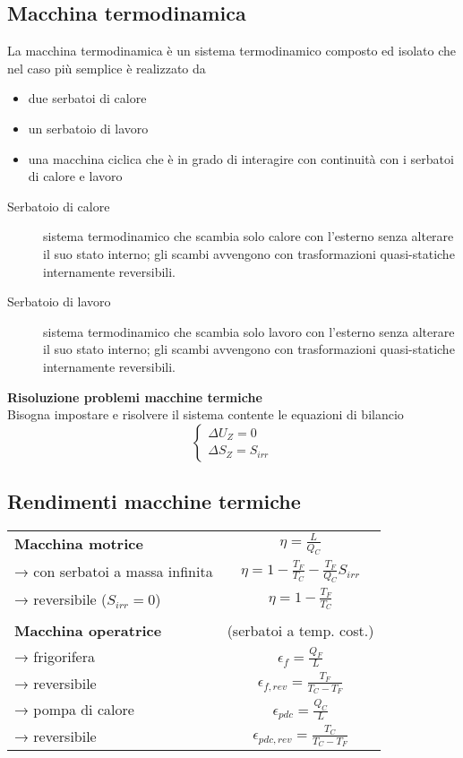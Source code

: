 \subsection{Macchina termodinamica}
La macchina termodinamica è un sistema termodinamico composto ed isolato che nel caso più semplice è realizzato da
\begin{itemize}
\item due serbatoi di calore
\item un serbatoio di lavoro
\item una macchina ciclica che è in grado di interagire con continuità con i serbatoi di calore e lavoro
\end{itemize}

\begin{description}
\item[Serbatoio di calore]
sistema termodinamico che scambia solo calore con l'esterno senza alterare il suo stato interno;
gli scambi avvengono con trasformazioni quasi-statiche internamente reversibili.
\item[Serbatoio di lavoro]
sistema termodinamico che scambia solo lavoro con l'esterno senza alterare il suo stato interno;
gli scambi avvengono con trasformazioni quasi-statiche internamente reversibili.
\end{description}

\textbf{Risoluzione problemi macchine termiche}\\
Bisogna impostare e risolvere il sistema contente le equazioni di bilancio
\[
    \begin{cases}
    \Delta U_Z = 0 \\
    \Delta S_Z = S_{irr}
    \end{cases}
\]

{\renewcommand{\arraystretch}{1.5}
\subsection{Rendimenti macchine termiche}
\begin{tabular}{p{4cm}c}
\textbf{Macchina motrice} & $\eta = \frac{L}{Q_C}$ \\
→ con serbatoi a massa infinita & $\eta = 1 - \frac{T_F}{T_C} - \frac{T_F}{Q_C}S_{irr}$ \\
\phantom{→}→ reversibile ($S_{irr} = 0$) & $\eta = 1 - \frac{T_F}{T_C}$ \\
\\
\textbf{Macchina operatrice} & (serbatoi a temp. cost.) \\
→ frigorifera & $\epsilon_f = \frac{Q_F}{L}$ \\
\phantom{→}→ reversibile & $\epsilon_{f,rev} = \frac{T_F}{T_C - T_F}$ \\
→ pompa di calore & $\epsilon_{pdc} = \frac{Q_C}{L}$ \\
\phantom{→}→ reversibile & $\epsilon_{pdc,rev} = \frac{T_C}{T_C - T_F}$ \\
\end{tabular}
}
